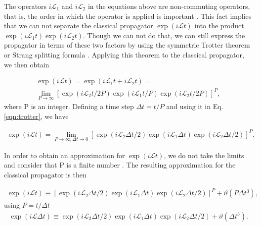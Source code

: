 The operators $i\mathcal{L}_{1}$ and $i\mathcal{L}_{2}$ in the equations above are non-commuting operators, that is, the order in which the operator is applied is important \cite{tuckerman}. This fact implies that we can not separate the classical propagator $\exp (i\mathcal{L}t)$  into the product $\exp (i\mathcal{L}_{1}t) \exp (i\mathcal{L}_{2}t)$. Though we can not do that, we can still express the propagator in terms of these two factors by using the symmetric Trotter theorem or Strang splitting formula \cite{trotter,strang}. Applying this theorem to the classical propagator, we then obtain

\begin{equation}
\begin{aligned}
\exp (i\mathcal{L}t)  = \exp (i\mathcal{L}_{1}t + i\mathcal{L}_{2}t) = \\
\lim\limits_{P \rightarrow \infty} \left [ \exp (i\mathcal{L}_{2}t/2P) \exp (i\mathcal{L}_{1}t/P) \exp (i\mathcal{L}_{2}t/2P) \right ]^{P},
\end{aligned}
\label{eqn:trotter}
\end{equation}
where P is an integer. Defining a time step $\Delta t =t/P$ and using it in Eq. \ref{eqn:trotter}, we have

\begin{equation}
\begin{aligned}
\exp (i\mathcal{L}t)  = 
\lim\limits_{P \rightarrow \infty, \Delta t \rightarrow 0} \left [ \exp (i\mathcal{L}_{2} \Delta t/2) \exp (i\mathcal{L}_{1} \Delta t) \exp (i\mathcal{L}_{2} \Delta t/2) \right ]^{P}.
\end{aligned}
\label{eqn:trotterdt}
\end{equation}

In order to obtain an approximation for $\exp (i\mathcal{L}t)$, we do not take the limits and consider that P is a finite number \cite{tuckerman}. The resulting approximation for the classical propagator is then 

\begin{equation}
\begin{aligned}
\exp (i\mathcal{L}t)  \equiv
\left [ \exp (i\mathcal{L}_{2} \Delta t/2) \exp (i\mathcal{L}_{1} \Delta t) \exp (i\mathcal{L}_{2} \Delta t/2) \right ]^{P} + \vartheta (P \Delta t^{3}),
\end{aligned}
\end{equation}
using $P= t/\Delta t$
\begin{equation}
\begin{aligned}
\exp (i\mathcal{L} \Delta t)  \equiv
\exp (i\mathcal{L}_{2} \Delta t/2) \exp (i\mathcal{L}_{1} \Delta t) \exp (i\mathcal{L}_{2} \Delta t/2)  + \vartheta (\Delta t^{3}).
\end{aligned}
\label{eqn:trotterfin}
\end{equation}  

